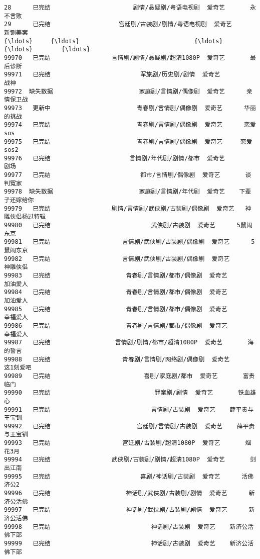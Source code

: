 \documentclass[11pt]{article}
\begin{document}
\begin{Verbatim}[commandchars=\\\{\}]
28      已完结                       剧情/悬疑剧/粤语电视剧  爱奇艺       永不言败   
29      已完结                   宫廷剧/古装剧/剧情/粤语电视剧  爱奇艺       新铡美案   
{\ldots}     {\ldots}                                {\ldots}  {\ldots}        {\ldots}   
99970   已完结                 言情剧/剧情/悬疑剧/超清1080P  爱奇艺       最后诊断   
99971   已完结                         军旅剧/历史剧/剧情  爱奇艺         战神   
99972  缺失数据                        家庭剧/言情剧/偶像剧  爱奇艺      亲情保卫战   
99973   更新中                        青春剧/言情剧/偶像剧  爱奇艺      华丽的挑战   
99974   已完结                        青春剧/言情剧/偶像剧  爱奇艺      恋爱sos   
99975   已完结                        青春剧/言情剧/偶像剧  爱奇艺     恋爱sos2   
99976   已完结                      言情剧/年代剧/剧情/都市  爱奇艺         剧场   
99977   已完结                         都市/言情剧/偶像剧  爱奇艺       谈判冤家   
99978  缺失数据                        家庭剧/言情剧/年代剧  爱奇艺    下辈子还嫁给你   
99979   已完结                 剧情/言情剧/武侠剧/古装剧/偶像剧  爱奇艺   神雕侠侣杨过特辑   
99980   已完结                            武侠剧/古装剧  爱奇艺      5鼠闹东京   
99981   已完结                    言情剧/武侠剧/古装剧/偶像剧  爱奇艺      5鼠闹东京   
99982   已完结                    言情剧/武侠剧/古装剧/偶像剧  爱奇艺       神雕侠侣   
99983   已完结                     青春剧/言情剧/都市/偶像剧  爱奇艺       加油爱人   
99984   已完结                     青春剧/言情剧/都市/偶像剧  爱奇艺       加油爱人   
99985   已完结                     青春剧/言情剧/都市/偶像剧  爱奇艺       幸福爱人   
99986   已完结                     青春剧/言情剧/都市/偶像剧  爱奇艺       幸福爱人   
99987   已完结                  言情剧/剧情/都市/超清1080P  爱奇艺       海的誓言   
99988   已完结                    青春剧/言情剧/网络剧/偶像剧  爱奇艺      这1刻爱吧   
99989   已完结                          喜剧/家庭剧/都市  爱奇艺       富贵临门   
99990   已完结                             罪案剧/剧情  爱奇艺       铁血雄心   
99991   已完结                            言情剧/古装剧  爱奇艺    薛平贵与王宝钏   
99992   已完结                        宫廷剧/言情剧/古装剧  爱奇艺    薛平贵与王宝钏   
99993   已完结                    宫廷剧/古装剧/超清1080P  爱奇艺       烟花3月   
99994   已完结                 武侠剧/古装剧/剧情/超清1080P  爱奇艺       剑出江南   
99995   已完结                         喜剧/神话剧/古装剧  爱奇艺      活佛济公2   
99996   已完结                     神话剧/武侠剧/古装剧/剧情  爱奇艺      新济公活佛   
99997   已完结                     神话剧/武侠剧/古装剧/剧情  爱奇艺      新济公活佛   
99998   已完结                            神话剧/古装剧  爱奇艺    新济公活佛下部   
99999   已完结                            神话剧/古装剧  爱奇艺    新济公活佛下部   


\end{Verbatim}
\end{document}
